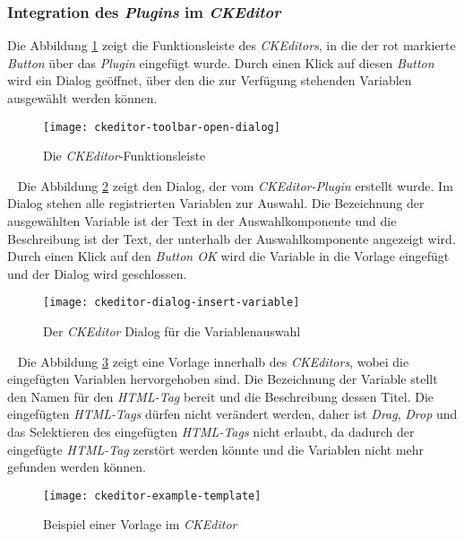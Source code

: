 \subsubsection{Integration des \emph{Plugins} im \emph{CKEditor}}
Die Abbildung \ref{fig:ckeditor-toolbar-opne-dialog} zeigt die Funktionsleiste des \emph{CKEditors}, in die der rot markierte \emph{Button} über das \emph{Plugin} eingefügt wurde. Durch einen Klick auf diesen \emph{Button} wird ein Dialog geöffnet, über den die zur Verfügung stehenden Variablen ausgewählt werden können.
\begin{figure}[h]
\centering
\texttt{[image: ckeditor-toolbar-open-dialog]}
\caption{Die \emph{CKEditor}-Funktionsleiste}
\label{fig:ckeditor-toolbar-opne-dialog}
\end{figure}
\ \newline
Die Abbildung \ref{fig:ckeditor-dialog-insert-variable} zeigt den Dialog, der vom \emph{CKEditor-Plugin} erstellt wurde. Im Dialog stehen alle registrierten Variablen zur Auswahl. Die Bezeichnung der ausgewählten Variable ist der Text in der Auswahlkomponente und die Beschreibung ist der Text, der unterhalb der Auswahlkomponente angezeigt wird. Durch einen Klick auf den \emph{Button OK} wird die Variable in die Vorlage eingefügt und der Dialog wird geschlossen.
\begin{figure}[h]
\centering
\texttt{[image: ckeditor-dialog-insert-variable]}
\caption{Der \emph{CKEditor} Dialog für die Variablenauswahl}
\label{fig:ckeditor-dialog-insert-variable}
\end{figure}
\ \newline
Die Abbildung \ref{fig:ckeditor-example-template} zeigt eine Vorlage innerhalb des \emph{CKEditors}, wobei die eingefügten Variablen hervorgehoben sind. Die Bezeichnung  der Variable stellt den Namen für den \emph{HTML-Tag} bereit und die Beschreibung dessen Titel. Die eingefügten \emph{HTML-Tags} dürfen nicht verändert werden, daher ist \emph{Drag}, \emph{Drop} und das Selektieren des eingefügten \emph{HTML-Tags} nicht erlaubt, da dadurch der eingefügte \emph{HTML-Tag} zerstört werden könnte und die Variablen nicht mehr gefunden werden können.
\begin{figure}[h]
\centering
\texttt{[image: ckeditor-example-template]}
\caption{Beispiel einer Vorlage im \emph{CKEditor}}
\label{fig:ckeditor-example-template}
\end{figure}

